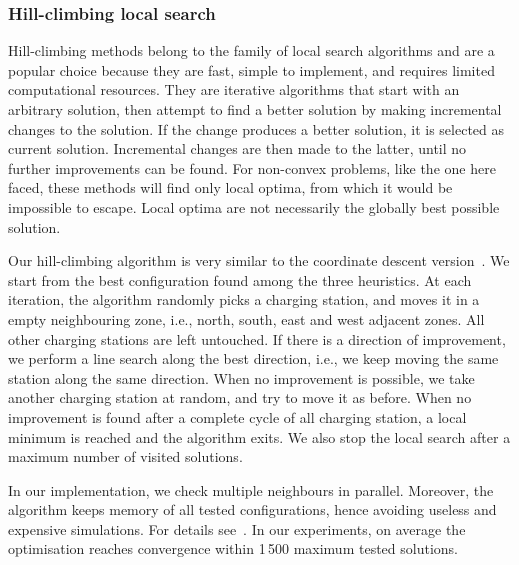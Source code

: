 \subsubsection{Hill-climbing local search}

Hill-climbing methods belong to the family of local search algorithms and are a popular choice because they are fast, simple to implement, and requires limited computational resources. They are iterative algorithms that start with an arbitrary solution, then attempt to find a better solution by making incremental changes to the solution. If the change produces a better solution, it is selected as current solution. Incremental changes are then made to the latter, until no further improvements can be found.
For non-convex problems, like the one here faced, these methods will find only local optima, from which it would be impossible to escape. 
Local optima are not necessarily the globally best possible solution.

Our hill-climbing algorithm is very similar to the coordinate descent version~\cite{CoordinateDescent}.
We start from the best configuration found among the three heuristics.
At each iteration, the algorithm randomly picks a charging station, and moves it in a empty neighbouring zone, i.e., north, south, east and west adjacent zones. All other charging stations are left untouched. If there is a direction of improvement, we perform a line search along the best direction, i.e., we keep moving the same station along the same direction. When no improvement is possible, we take another charging station at random, and try to move it as before.
When no improvement is found after a complete cycle of all charging station, a local minimum is reached and the algorithm exits. We also stop the local search after a maximum number of visited solutions.

In our implementation, we check multiple neighbours in parallel. Moreover, the algorithm keeps memory of all tested configurations, hence avoiding useless and expensive simulations. For details see~\cite{MicheleGithub}. 
In our experiments, on average the optimisation reaches convergence within 1\,500 maximum tested solutions. 


